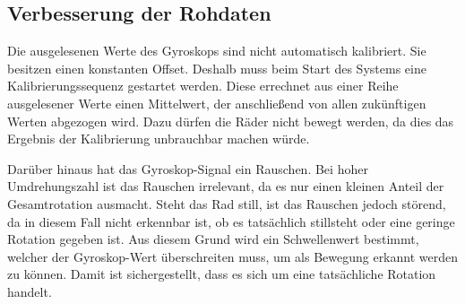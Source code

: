 \subsection{Verbesserung der Rohdaten}
Die ausgelesenen Werte des Gyroskops sind nicht automatisch kalibriert.
Sie besitzen einen konstanten Offset. Deshalb muss beim Start des Systems eine Kalibrierungssequenz gestartet werden.
Diese errechnet aus einer Reihe ausgelesener Werte einen Mittelwert, der anschließend von allen zukünftigen Werten abgezogen wird.
Dazu dürfen die Räder nicht bewegt werden, da dies das Ergebnis der Kalibrierung unbrauchbar machen würde.

Darüber hinaus hat das Gyroskop-Signal ein Rauschen.
Bei hoher Umdrehungszahl ist das Rauschen irrelevant, da es nur einen kleinen Anteil der Gesamtrotation ausmacht.
Steht das Rad still, ist das Rauschen jedoch störend, da in diesem Fall nicht erkennbar ist, ob es tatsächlich stillsteht oder eine geringe Rotation gegeben ist.
Aus diesem Grund wird ein Schwellenwert bestimmt, welcher der Gyroskop-Wert überschreiten muss, um als Bewegung erkannt werden zu können.
Damit ist sichergestellt, dass es sich um eine tatsächliche Rotation handelt.

